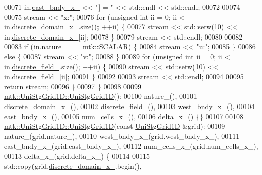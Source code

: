 \begin{DoxyCode}
00071   in.\hyperlink{classmtk_1_1UniStgGrid1D_a69a7d6be3171e53177e476348d04f4ae}{east\_bndy\_x\_} << \textcolor{stringliteral}{"] = "} << std::endl << std::endl;
00072 
00074 
00075   stream << \textcolor{stringliteral}{"x:"};
00076   \textcolor{keywordflow}{for} (\textcolor{keywordtype}{unsigned} \textcolor{keywordtype}{int} ii = 0; ii < in.\hyperlink{classmtk_1_1UniStgGrid1D_a0a1f9c00e21659e05f414dd97e2a52e3}{discrete\_domain\_x\_}.size(); ++ii) \{
00077     stream << std::setw(10) << in.\hyperlink{classmtk_1_1UniStgGrid1D_a0a1f9c00e21659e05f414dd97e2a52e3}{discrete\_domain\_x\_}[ii];
00078   \}
00079   stream << std::endl;
00080 
00082 
00083   \textcolor{keywordflow}{if} (in.\hyperlink{classmtk_1_1UniStgGrid1D_a061b66c92532b1498ce0e15418754911}{nature\_} == \hyperlink{namespacemtk_ga4c54f2a329cfb4e56213b02a259d19e2af481d45bd70d41381c7d72e200889205}{mtk::SCALAR}) \{
00084     stream << \textcolor{stringliteral}{"u:"};
00085   \}
00086   \textcolor{keywordflow}{else} \{
00087     stream << \textcolor{stringliteral}{"v:"};
00088   \}
00089   \textcolor{keywordflow}{for} (\textcolor{keywordtype}{unsigned} \textcolor{keywordtype}{int} ii = 0; ii < in.\hyperlink{classmtk_1_1UniStgGrid1D_a7379a5c6d16210cdd61ffa731bc47edc}{discrete\_field\_}.size(); ++ii) \{
00090     stream << std::setw(10) << in.\hyperlink{classmtk_1_1UniStgGrid1D_a7379a5c6d16210cdd61ffa731bc47edc}{discrete\_field\_}[ii];
00091   \}
00092 
00093   stream << std::endl;
00094 
00095   \textcolor{keywordflow}{return} stream;
00096 \}
00097 \}
00098 
\hypertarget{mtk__uni__stg__grid__1d_8cc_source_l00099}{}\hyperlink{classmtk_1_1UniStgGrid1D_ab0c1bb8afad2420fdb4434eb21bdec82}{00099} \hyperlink{classmtk_1_1UniStgGrid1D_ab0c1bb8afad2420fdb4434eb21bdec82}{mtk::UniStgGrid1D::UniStgGrid1D}():
00100     nature\_(),
00101     discrete\_domain\_x\_(),
00102     discrete\_field\_(),
00103     west\_bndy\_x\_(),
00104     east\_bndy\_x\_(),
00105     num\_cells\_x\_(),
00106     delta\_x\_() \{\}
00107 
\hypertarget{mtk__uni__stg__grid__1d_8cc_source_l00108}{}\hyperlink{classmtk_1_1UniStgGrid1D_a56d698e803070d96601b46f470bfef0b}{00108} \hyperlink{classmtk_1_1UniStgGrid1D_ab0c1bb8afad2420fdb4434eb21bdec82}{mtk::UniStgGrid1D::UniStgGrid1D}(\textcolor{keyword}{const} 
      \hyperlink{classmtk_1_1UniStgGrid1D}{UniStgGrid1D} &grid):
00109     nature\_(grid.nature\_),
00110     west\_bndy\_x\_(grid.west\_bndy\_x\_),
00111     east\_bndy\_x\_(grid.east\_bndy\_x\_),
00112     num\_cells\_x\_(grid.num\_cells\_x\_),
00113     delta\_x\_(grid.delta\_x\_) \{
00114 
00115     std::copy(grid.\hyperlink{classmtk_1_1UniStgGrid1D_a0a1f9c00e21659e05f414dd97e2a52e3}{discrete\_domain\_x\_}.begin(),

\end{DoxyCode}
